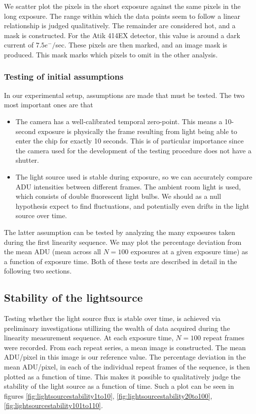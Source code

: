 \documentclass[../main.tex]{subfiles}
\begin{document}
		We scatter plot the pixels in the short exposure against the same pixels in the long exposure. The range within which the data points seem to follow a linear relationship is judged qualitatively. The remainder are considered hot, and a mask is constructed. For the Atik 414EX detector, this value is around a dark current of $7.5 e^-/$sec. These pixels are then marked, and an image mask is produced. This mask marks which pixels to omit in the other analysis.
		
		\subsubsection{Testing of initial assumptions}
		In our experimental setup, assumptions are made that must be tested. The two most important ones are that 
		\begin{itemize}
			\item The camera has a well-calibrated temporal zero-point. This means a 10-second exposure is physically the frame resulting from light being able to enter the chip for exactly 10 seconds. This is of particular importance since the camera used for the development of the testing procedure does not have a shutter.
			\item The light source used is stable during exposure, so we can accurately compare ADU intensities between different frames. The ambient room light is used, which consists of double fluorescent light bulbs. We should as a null hypothesis expect to find fluctuations, and potentially even drifts in the light source over time.
		\end{itemize}
		The latter assumption can be tested by analyzing the many exposures taken during the first linearity sequence. We may plot the percentage deviation from the mean ADU (mean across all $N=100$ exposures at a given exposure time) as a function of exposure time. Both of these tests are described in detail in the following two sections. 
		
		\subsection{Stability of the lightsource}\label{sec:stabillitylight}
		Testing whether the light source flux is stable over time, is achieved via preliminary investigations utillizing the wealth of data acquired during the linearity measurement sequence. At each exposure time, $N = 100$ repeat frames were recorded. From each repeat series, a mean image is constructed. The mean ADU/pixel in this image is our reference value. The percentage deviation in the mean ADU/pixel, in each of the individual repeat frames of the sequence, is then plotted as a function of time. This makes it possible to qualitatively judge the stability of the light source as a function of time. Such a plot can be seen in figures \ref{fig:lightsourcestability1to10},  \ref{fig:lightsourcestability20to100},  \ref{fig:lightsourcestability101to110}.
		
\end{document}
